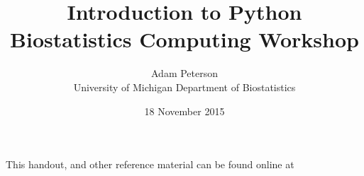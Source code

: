 \documentclass{article}
\title{Introduction to Python\\
	\Large{Biostatistics Computing Workshop}}
\author{Adam Peterson \\ \small{University of Michigan Department of Biostatistics}}
\date{18 November 2015}
\begin{document}
	\maketitle
	
	This handout, and other reference material can be found online at 
\end{document}
